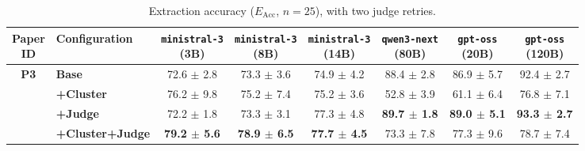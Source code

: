\begin{table}[htbp]
    \centering
    \small
    \setlength{\tabcolsep}{4pt}
    \caption{Extraction accuracy ($E_{\text{Acc}}$, $n=25$), with two judge retries.}
    \begin{tabular}{c|l|cccccc}
        \toprule
        \makecell{\textbf{Paper} \\ \textbf{ID}} & \textbf{Configuration}& \makecell{\texttt{ministral-3} \\ (3B)} & \makecell{\texttt{ministral-3} \\ (8B)} & \makecell{\texttt{ministral-3} \\ (14B)} & \makecell{\texttt{qwen3-next} \\ (80B)} & \makecell{\texttt{gpt-oss} \\ (20B)} & \makecell{\texttt{gpt-oss} \\ (120B)} \\
        \hline
        
        \multirow{4}{*}{\textbf{P3}} 
          & \textbf{Base}& 72.6 $\pm$ 2.8 & 73.3 $\pm$ 3.6 & 74.9 $\pm$ 4.2 & 88.4 $\pm$ 2.8 & 86.9 $\pm$ 5.7 & 92.4 $\pm$ 2.7 \\
          & \textbf{+Cluster}& 76.2 $\pm$ 9.8 & 75.2 $\pm$ 7.4 & 75.2 $\pm$ 3.6 & 52.8 $\pm$ 3.9 & 61.1 $\pm$ 6.4 & 76.8 $\pm$ 7.1 \\
          & \textbf{+Judge}& 72.2 $\pm$ 1.8 & 73.3 $\pm$ 3.1 & 77.3 $\pm$ 4.8 & \textbf{89.7 $\pm$ 1.8} & \textbf{89.0 $\pm$ 5.1} & \textbf{93.3 $\pm$ 2.7} \\
          & \textbf{+Cluster+Judge}& \textbf{79.2 $\pm$ 5.6} & \textbf{78.9 $\pm$ 6.5} & \textbf{77.7 $\pm$ 4.5} & 73.3 $\pm$ 7.8 & 77.3 $\pm$ 9.6 & 78.7 $\pm$ 7.4 \\
        \hline
        
        \bottomrule
    \end{tabular}
    \label{tab:results_p3}
\end{table}